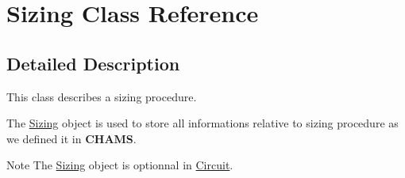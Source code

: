 \hypertarget{class_sizing}{}\section{Sizing Class Reference}
\label{class_sizing}


\subsection{Detailed Description}
This class describes a sizing procedure.

The \mbox{\hyperlink{class_sizing}{Sizing}} object is used to store all informations relative to sizing procedure as we defined it in {\bfseries C\+H\+A\+MS}.

\begin{DoxyNote}{Note}
The \mbox{\hyperlink{class_sizing}{Sizing}} object is optionnal in \mbox{\hyperlink{class_circuit}{Circuit}}. 
\end{DoxyNote}
